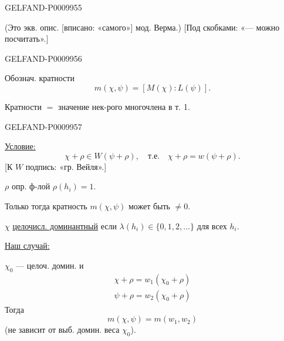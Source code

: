 \begin{GelfandAdjacentEvidence}{GELFAND-P000995}{5}


(Это экв. опис. [вписано: «самого»] мод. Верма.)
[Под скобками: «--- можно посчитать».]
\end{GelfandAdjacentEvidence}
\begin{GelfandAdjacentEvidence}{GELFAND-P000995}{6}


Обознач. кратности
\[
m(\chi,\psi)=[M(\chi):L(\psi)].
\]

Кратности $=$ значение нек-рого многочлена в т. 1.
\end{GelfandAdjacentEvidence}
\begin{GelfandAdjacentEvidence}{GELFAND-P000995}{7}


\underline{Условие:}
\[
\chi+\rho\in W(\psi+\rho),\quad
\text{т.е.}\quad \chi+\rho=w(\psi+\rho).
\]
[К $W$ подпись: «гр. Вейля».]

$\rho$ опр. ф-лой $\rho(h_i)=1$.

Только тогда кратность $m(\chi,\psi)$ может быть $\ne0$.

$\chi$ \underline{целочисл. доминантный} если $\lambda(h_i)\in\{0,1,2,\ldots\}$ для всех $h_i$.
\end{GelfandAdjacentEvidence}



\underline{Наш случай:}

$\chi_0$ --- целоч. домин. и
\begin{gather*}
\chi+\rho=w_1(\chi_0+\rho)\\
\psi+\rho=w_2(\chi_0+\rho)
\end{gather*}
Тогда
\[
m(\chi,\psi)=m(w_1,w_2)
\]
(не зависит от выб. домин. веса $\chi_0$).


